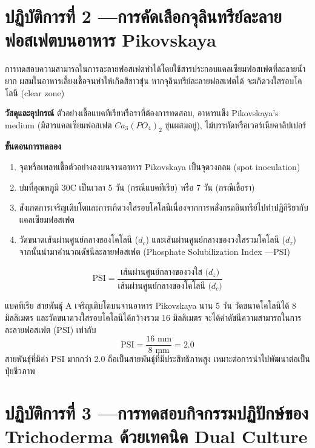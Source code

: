 \section{ปฏิบัติการที่ 2 —การคัดเลือกจุลินทรีย์ละลายฟอสเฟตบนอาหาร Pikovskaya}

การทดสอบความสามารถในการละลายฟอสเฟตทำได้โดยใช้สารประกอบแคลเซียมฟอสเฟตที่ละลายน้ำยาก ผสมในอาหารเลี้ยงเชื้อจนทำให้เกิดสีขาวขุ่น หากจุลินทรีย์ละลายฟอสเฟตได้ จะเกิดวงใสรอบโคโลนี (clear zone)

\begin{labprotocol}
\textbf{วัสดุและอุปกรณ์} ตัวอย่างเชื้อแบคทีเรียหรือราที่ต้องการทดสอบ, อาหารแข็ง Pikovskaya's medium (มีสารแคลเซียมฟอสเฟต $Ca_3(PO_4)_2$ ขุ่นผสมอยู่), ไม้บรรทัดหรือเวอร์เนียคาลิปเปอร์

\textbf{ขั้นตอนการทดลอง}
\begin{enumerate}
    \item จุดหรือเพลทเชื้อตัวอย่างลงบนจานอาหาร Pikovskaya เป็นจุดวงกลม (spot inoculation)
    \item บ่มที่อุณหภูมิ 30\degree C เป็นเวลา 5 วัน (กรณีแบคทีเรีย) หรือ 7 วัน (กรณีเชื้อรา)
    \item สังเกตการเจริญเติบโตและการเกิดวงใสรอบโคโลนีเนื่องจากการหลั่งกรดอินทรีย์ไปทำปฏิกิริยากับแคลเซียมฟอสเฟต
    \item วัดขนาดเส้นผ่านศูนย์กลางของโคโลนี ($d_c$) และเส้นผ่านศูนย์กลางของวงใสรวมโคโลนี ($d_z$) จากนั้นนำมาคำนวณดัชนีละลายฟอสเฟต (Phosphate Solubilization Index —PSI)
\end{enumerate}

\begin{equation}
\text{PSI} = \frac{\text{เส้นผ่านศูนย์กลางของวงใส (} d_z \text{)}}{\text{เส้นผ่านศูนย์กลางของโคโลนี (} d_c \text{)}}
\end{equation}
\end{labprotocol}

\begin{worked}
แบคทีเรีย  สายพันธุ์ A เจริญเติบโตบนจานอาหาร Pikovskaya นาน 5 วัน วัดขนาดโคโลนีได้ 8 มิลลิเมตร และวัดขนาดวงใสรอบโคโลนีได้กว้างรวม 16 มิลลิเมตร จะได้ค่าดัชนีความสามารถในการละลายฟอสเฟต (PSI) เท่ากับ
$$\text{PSI} = \frac{16\text{ mm}}{8\text{ mm}} = 2.0$$
สายพันธุ์ที่มีค่า PSI มากกว่า 2.0 ถือเป็นสายพันธุ์ที่มีประสิทธิภาพสูง เหมาะต่อการนำไปพัฒนาต่อเป็นปุ๋ยชีวภาพ
\end{worked}

\section{ปฏิบัติการที่ 3 —การทดสอบกิจกรรมปฏิปักษ์ของ Trichoderma ด้วยเทคนิค Dual Culture}

